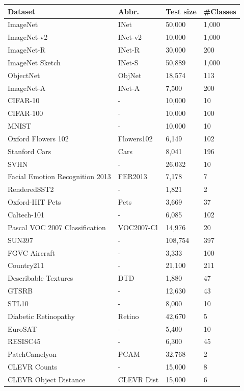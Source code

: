\begin{appendix}
\begin{table}[!h]
\centering
{}
\begin{tabular}{@{}llll@{}}
\toprule
\bf{Dataset} & \bf{Abbr.}  & \bf{Test size} & \bf{\#Classes}\\\midrule
ImageNet & INet & 50,000 &1,000\\
ImageNet-v2 & INet-v2 & 10,000 &1,000\\
ImageNet-R & INet-R & 30,000 &200\\
ImageNet Sketch & INet-S & 50,889 &1,000\\
ObjectNet & ObjNet & 18,574 &113\\
ImageNet-A & INet-A & 7,500 &200\\
CIFAR-10 & - & 10,000 &10\\
CIFAR-100 & - & 10,000 &100\\
MNIST & - & 10,000 &10\\
Oxford Flowers 102 & Flowers102 & 6,149 &102\\
Stanford Cars & Cars & 8,041 &196\\
SVHN & - & 26,032 &10\\
Facial Emotion Recognition 2013 & FER2013 & 7,178 &7\\
RenderedSST2 & - & 1,821 &2\\
Oxford-IIIT Pets & Pets & 3,669 &37\\
Caltech-101 & - & 6,085 &102\\
Pascal VOC 2007 Classification & VOC2007-Cl & 14,976 &20\\
SUN397 & - & 108,754 &397\\
FGVC Aircraft & - & 3,333 &100\\
Country211 & - & 21,100 &211\\
Describable Textures & DTD & 1,880 &47\\
GTSRB & - & 12,630 &43\\
STL10 & - & 8,000 &10\\
Diabetic Retinopathy & Retino & 42,670 &5\\
EuroSAT & - & 5,400 &10\\
RESISC45 & - & 6,300 &45\\
PatchCamelyon & PCAM & 32,768 &2\\
CLEVR Counts & - & 15,000 &8\\
CLEVR Object Distance & CLEVR Dist & 15,000 &6\\

\end{tabular}
\end{table}
\end{appendix}
